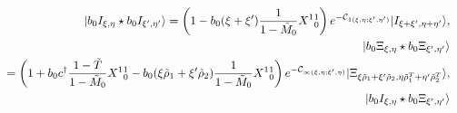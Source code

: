 \documentclass[12pt,a4paper]{article}
\def\T{{\tilde T}}
\def\M0{{\tilde M}_0}
\def\Mp{{\tilde M}_+}
\def\Mm{{\tilde M}_-}
\begin{document}
\begin{eqnarray}
\label{eqn:ISXH}
&&|b_0I_{\xi,\eta}\star b_0I_{\xi',\eta'}\rangle%
=\left(1-b_0 (\xi+\xi'){1\over1-\M0 }X^1{}^1_0\right)e^{-{\cal C}_{1(\xi,\eta;\xi',\eta')}}|I_{\xi+\xi',\eta+\eta'}\rangle,\nonumber \\
&&|b_0\Xi_{\xi,\eta}\star b_0\Xi_{\xi',\eta'}\rangle\nonumber \\
&&=\left(1+b_0c^\dagger{1-\T \over1-\M0 }X^1{}^1_0 -b_0(\xi{\tilde \rho}_1+\xi'{\tilde \rho}_2){1\over1-\M0 }X^1{}^1_0 \right)e^{-{\cal C}_{\infty(\xi,\eta;\xi',\eta)}}|\Xi_{\xi{\tilde \rho}_1+\xi'{\tilde \rho}_2,\eta{\tilde \rho}_1^T+\eta'{\tilde \rho}_2^T}\rangle,\nonumber \\
&&|b_0I_{\xi,\eta}\star b_0\Xi_{\xi',\eta'}\rangle%

\end{eqnarray}
\end{document}
